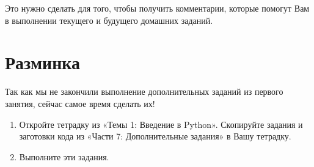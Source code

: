 \documentclass[11pt, a4paper]{extarticle}
\begin{document}
\begin{enumerate}
	Это нужно сделать для того, чтобы получить комментарии, которые помогут Вам в выполнении текущего и будущего домашних заданий. 
\end{enumerate}

\section{Разминка}
Так как мы не закончили выполнение дополнительных заданий из первого занятия, сейчас самое время сделать их! 
\begin{enumerate}
	\item Откройте тетрадку из «Темы 1: Введение в Python». Скопируйте задания и заготовки кода из «Части 7: Дополнительные задания» в Вашу тетрадку.
	\item Выполните эти задания. 
\end{enumerate}
\end{document}
